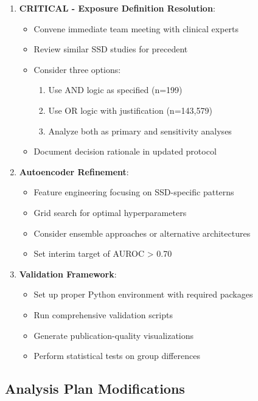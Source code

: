\documentclass[11pt]{article}
\begin{document}
\begin{enumerate}
    \item \textcolor{alertred}{\textbf{CRITICAL - Exposure Definition Resolution}}:
    \begin{itemize}
        \item Convene immediate team meeting with clinical experts
        \item Review similar SSD studies for precedent
        \item Consider three options:
        \begin{enumerate}
            \item Use AND logic as specified (n=199)
            \item Use OR logic with justification (n=143,579)
            \item Analyze both as primary and sensitivity analyses
        \end{enumerate}
        \item Document decision rationale in updated protocol
    \end{itemize}
    
    \item \textbf{Autoencoder Refinement}:
    \begin{itemize}
        \item Feature engineering focusing on SSD-specific patterns
        \item Grid search for optimal hyperparameters
        \item Consider ensemble approaches or alternative architectures
        \item Set interim target of AUROC > 0.70
    \end{itemize}
    
    \item \textbf{Validation Framework}:
    \begin{itemize}
        \item Set up proper Python environment with required packages
        \item Run comprehensive validation scripts
        \item Generate publication-quality visualizations
        \item Perform statistical tests on group differences
    \end{itemize}
\end{enumerate}

\subsection{Analysis Plan Modifications}
\end{document}
